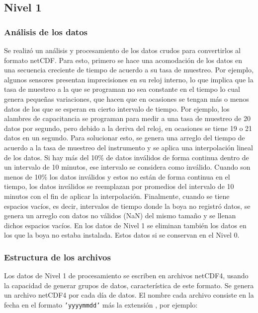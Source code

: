 \documentclass[11pt]{article}
\begin{document}
\subsection{Nivel 1}
\label{sub:nivel_1}

\subsubsection*{Análisis de los datos}

Se realizó un análisis y procesamiento de los datos crudos para convertirlos al
formato netCDF. Para esto, primero se hace una acomodación de los datos en una
secuencia creciente de tiempo de acuerdo a su tasa de muestreo. Por ejemplo,
algunos sensores presentan imprecisiones en su reloj interno, lo que implica que
la tasa de muestreo a la que se programan no sea constante en el tiempo lo cual
genera pequeñas variaciones, que hacen que en ocasiones se tengan más o menos
datos de los que se esperan en cierto intervalo de tiempo. Por ejemplo, los
alambres de capacitancia se programan para medir a una tasa de muestreo de 20
datos por segundo, pero debido a la deriva del reloj, en ocasiones se tiene 19 o
21 datos en un segundo. Para solucionar esto, se genera una arreglo del tiempo
de acuerdo a la tasa de muestreo del instrumento y se aplica una interpolación
lineal de los datos. Si hay más del 10\% de datos inválidos de forma continua
dentro de un intervalo de 10 minutos, ese intervalo se considera como inválido.
Cuando son menos de 10\% los datos inválidos y estos no están de forma continua
en el tiempo, los datos inválidos se reemplazan por promedios del intervalo de
10 minutos con el fin de aplicar la interpolación.  Finalmente, cuando se tiene
espacios vacíos, es decir, intervalos de tiempo donde la boya no registró datos,
se genera un arreglo con datos no válidos (NaN) del mismo tamaño y se llenan
dichos espacios vacíos. En los datos de Nivel 1 se eliminan también los datos en
los que la boya no estaba instalada. Estos datos si se conservan en el Nivel 0.


\subsubsection*{Estructura de los archivos}%

Los datos de Nivel 1 de procesamiento se escriben en archivos netCDF4, usando la
capacidad de generar grupos de datos, característica de este formato. Se genera
un archivo netCDF4 por cada día de datos. El nombre cada archivo consiste en la
fecha en el formato \texttt{'yyyymmdd'} más la extensión , por
ejemplo:
\end{document}
